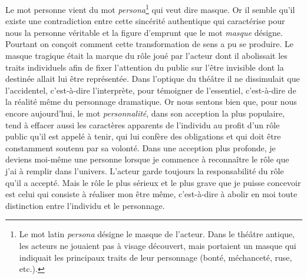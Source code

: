 
{Le mot personne vient du mot
\textit{persona}\footnote{Le mot latin \textit{persona} désigne le
masque de l'acteur. Dans le théâtre antique, les acteurs ne jouaient
pas à visage découvert, mais portaient un masque qui indiquait les
principaux traits de leur personnage (bonté, méchanceté, ruse,
etc.).} qui veut dire masque. Or il semble qu'il existe une
contradiction entre cette sincérité authentique qui caractérise pour
nous la personne véritable et la figure d'emprunt que le mot
\textit{masque} désigne. Pourtant on conçoit comment cette
transformation de sens a pu se produire. Le masque tragique était la
marque du rôle joué par l'acteur dont il abolissait les traits
individuels afin de fixer l'attention du public sur l'être invisible
dont la destinée allait lui être représentée. Dans l'optique du
théâtre il ne dissimulait que l'accidentel, c'est-à-dire
l'interprète, pour témoigner de l'essentiel, c'est-à-dire de la
réalité même du personnage dramatique. Or nous sentons bien que, pour
nous encore aujourd'hui, le mot \textit{personnalité}, dans son
acception la plus populaire, tend à effacer aussi les caractères
apparents de l'individu au profit d'un rôle public qu'il est appelé à
tenir, qui lui confère des obligations et qui doit être constamment
soutenu par sa volonté. Dans une acception plus profonde, je deviens
moi-même une personne lorsque je commence à reconnaître le rôle que
j'ai à remplir dans l'univers. L'acteur garde toujours la
responsabilité du rôle qu'il a accepté. Mais le rôle le plus sérieux
et le plus grave que je puisse concevoir est celui qui consiste à
réaliser mon être même, c'est-à-dire à abolir en moi toute
distinction entre l'individu et le personnage.
}


